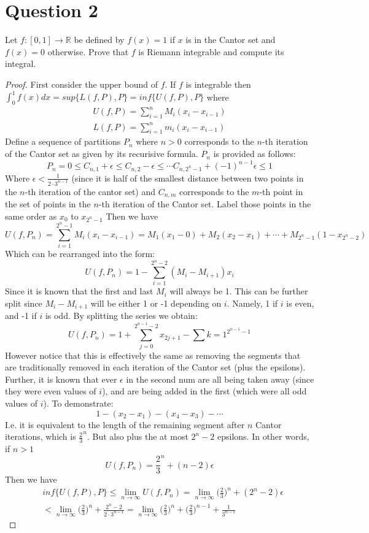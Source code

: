 \documentclass[12pt, letterpaper]{article}
\begin{document}
\section*{Question 2}
Let $f:[0,1]\rightarrow \mathbb R$ be defined by $f(x)=1$ if $x$ is in the Cantor set and $f(x)=0$ otherwise. Prove that $f$ is Riemann integrable and compute its
integral.
\begin{proof}
  First consider the upper bound of $f$. If $f$ is integrable then $\int_{0}^{1}f(x)dx = sup\{L(f,P),P\} = inf\{U(f,P),P\}$ where
  \begin{align*}
    U(f, P) = \sum_{i=1}^{n} M_i(x_i - x_{i-1})\\
    L(f, P) = \sum_{i=1}^{n} m_i(x_i - x_{i-1})
  \end{align*}
  Define a sequence of partitions $P_n$ where $n > 0$ corresponds to the $n$-th iteration of the Cantor set as given by its recurisive formula. $P_n$ is provided as follows:
  $$ P_n = 0 \leq C_{n, 1} + \epsilon \leq C_{n, 2} - \epsilon \leq \cdots C_{n, 2^n-1} + (-1)^{n-1}\epsilon \leq 1$$
  Where $\epsilon < \frac{1}{2\cdot3^{n-1}}$ (since it is half of the smallest distance between two points in the $n$-th iteration of the cantor set) and $C_{n, m}$ corresponds to the $m$-th point in the set of points in the $n$-th iteration of the Cantor set. Label those points in the same order as $x_0$ to $x_{2^n-1}$ Then we have
  $$ U(f, P_n) = \sum_{i = 1}^{2^n-1}M_i(x_i-x_{i-1}) = M_1(x_1 - 0) + M_2(x_2 - x_1) + \cdots + M_{2^n-1}(1 - x_{2^n-2})$$
  Which can be rearranged into the form:
  $$ U(f, P_n) = 1 - \sum_{i=1}^{2^n-2}(M_i-M_{i+1})x_i $$
  Since it is known that the first and last $M_i$ will always be 1. This can be further split since $M_i-M_{i+1}$ will be either 1 or -1 depending on $i$. Namely, 1 if $i$ is even, and -1 if $i$ is odd. By splitting the series we obtain:
  $$ U(f, P_n) = 1 + \sum_{j = 0}^{2^{n-1}-2}x_{2j+1} - \sum{k=1}^{2^{n-1}-1}$$
  However notice that this is effectively the same as removing the segments that are traditionally removed in each iteration of the Cantor set (plus the epsilons). Further, it is known that ever $\epsilon$ in the second num are all being taken away (since they were even values of $i$), and are being added in the first (which were all odd values of $i$). To demonstrate:
  $$ 1 - (x_2 - x_1) - (x_4-x_3) - \cdots $$
  I.e. it is equivalent to the length of the remaining segment after $n$ Cantor iterations, which is $\frac{2}{3}^n$. But also plus the at most $2^n - 2$ epsilons. In other words, if $n > 1$
  $$ U(f, P_n) = \frac{2}{3}^n + (n-2)\epsilon$$
  Then we have
  \begin{align*}
    &inf\{U(f,P), P\} \leq \lim_{n\to\infty}U(f, P_n) = \lim_{n\to\infty} \bigg(\frac{2}{3}\bigg)^n + (2^n-2)\epsilon\\
  &< \lim_{n\to\infty} \bigg(\frac{2}{3}\bigg)^n + \frac{2^n-2}{2\cdot3^{n-1}} = \lim_{n\to\infty} \bigg(\frac{2}{3}\bigg)^n + \bigg(\frac{2}{3}\bigg)^{n-1} + \frac{1}{3^{n-1}}
  \end{align*}


\end{proof}
\end{document}
